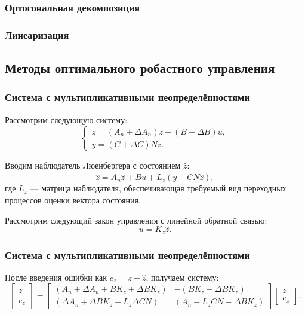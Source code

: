 \begin{frame}
    \frametitle{Ортогональная декомпозиция}
    \centering
\end{frame}

\begin{frame}
	\frametitle{Линеаризация}
	\centering
\end{frame}

\subsection{Методы оптимального робастного управления}

\begin{frame}
    \frametitle{Система с мультипликативными неопределённостями}
    Рассмотрим следующую систему:
    \begin{equation}
    	\label{eq:part2_linear_dynamics}
    	\begin{cases}
    		\dot z=({A}_n+\Delta {A}_n)z + ({B}+\Delta {B})u,\\
    		y = ({C}+ \Delta {C}){N}  z.
    	\end{cases}
    \end{equation}
    
    Вводим наблюдатель Люенбергера с состоянием $\hat{z}$:
    \begin{equation}
    	\label{eq:Luenberger}
    	\dot{\hat{z}}={A}_n\hat{z}+{B}u+{L}_z(y- {C} {N}\hat{z}),
    \end{equation}
    где ${L}_z$ --- матрица наблюдателя, обеспечивающая требуемый вид переходных процессов оценки вектора состояния. 
    
    Рассмотрим следующий закон управления с линейной обратной связью:
    \begin{equation}
    	\label{eq:control_law}
    	u={K}_z\hat{z}.
    \end{equation}
\end{frame}

\begin{frame}
	\frametitle{Система с мультипликативными неопределённостями}
	После введения ошибки как $e_z=z-\hat{z}$, получаем систему:
	\begin{equation}
		\label{eq:part2_system}
		\begin{bmatrix}
			\dot{z} \\ \dot{e}_z
		\end{bmatrix}=\begin{bmatrix}
			({A}_n+\Delta {A}_n +{B}{K}_z+\Delta {B}{K}_z) & -({B}{K}_z+\Delta {B}{K}_z) \\
			(\Delta {A}_n +\Delta {B}{K}_z-{L}_z\Delta {C}{N}) & ({A}_n-{L}_z{C}{N}-\Delta {B}{K}_z)        \end{bmatrix}\begin{bmatrix}
			z \\ e_z
		\end{bmatrix}.
	\end{equation}
\end{frame}
